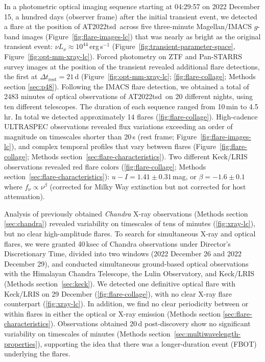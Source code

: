 \documentclass{nature_plusfigure}
\newcommand{\at}{AT2022tsd}
\begin{document}
In a photometric optical imaging sequence starting at 04:29:57 on 2022 December 15, a hundred days (observer frame) after the initial transient event, we detected\cite{Ho2022_Astronote_Flares} a flare at the position of \at\ across five three-minute Magellan/IMACS $g$-band images (Figure~\ref{fig:flare-images-lc}) that was nearly as bright as the original transient event: $\nu L_\nu \approx 10^{44}\,$erg\,s$^{-1}$ (Figure~\ref{fig:transient-parameter-space}, Figure~\ref{fig:opt-mm-xray-lc}).
Forced photometry on ZTF and Pan-STARRS survey\cite{Tonry2012,Chambers2016} images at the position of the transient revealed additional flare detections, the first at $\Delta t_\mathrm{rest}=21$\,d (Figure~\ref{fig:opt-mm-xray-lc}; \ref{fig:flare-collage}; Methods section \ref{sec:p48}).
Following the IMACS flare detection, we obtained a total of 2483 minutes of optical observations of \at\ on 20 different nights, using ten different telescopes. The duration of each sequence ranged from 10\,min to 4.5\,hr. In total we detected approximately 14 flares (\ref{fig:flare-collage}). High-cadence ULTRASPEC\cite{Dhillon2014} observations revealed flux variations exceeding an order of magnitude on timescales shorter than 20\,s (rest frame; Figure~\ref{fig:flare-images-lc}), and complex temporal profiles that vary between flares (Figure~\ref{fig:flare-collage}; Methods section~\ref{sec:flare-characteristics}).
Two different Keck/LRIS observations revealed red flare colors (\ref{fig:flare-collage}; Methods section~\ref{sec:flare-characteristics}):
$u-I=1.41\pm0.31\,$mag, or $\beta=-1.6\pm0.1$ where
$f_\nu \propto \nu^{\beta}$ (corrected for Milky Way extinction but not corrected for host attenuation).

Analysis of previously obtained \emph{Chandra} X-ray observations\cite{Matthews2022} (Methods section \ref{sec:chandra}) revealed variability on timescales of tens of minutes (\ref{fig:xray-lc}), but no clear high-amplitude flares. To search for simultaneous X-ray and optical flares,
we were granted 40\,ksec of Chandra observations under Director's Discretionary Time, divided into two windows (2022 December 26 and 2022 December 29),
and conducted simultaneous ground-based optical observations with the Himalayan Chandra Telescope, the Lulin Observatory, and Keck/LRIS (Methods section~\ref{sec:keck}). We detected one definitive optical flare with Keck/LRIS on 29 December (\ref{fig:flare-collage}), with no clear X-ray flare counterpart (\ref{fig:xray-lc}).
In addition, we find no clear periodicity between or within flares in either the optical or X-ray emission (Methods section \ref{sec:flare-characteristics}).
Observations obtained 20\,d post-discovery show no significant variability on timescales of minutes (Methods section~\ref{sec:multiwavelength-properties}), supporting the idea that there was a longer-duration event (FBOT) underlying the flares.
\end{document}
